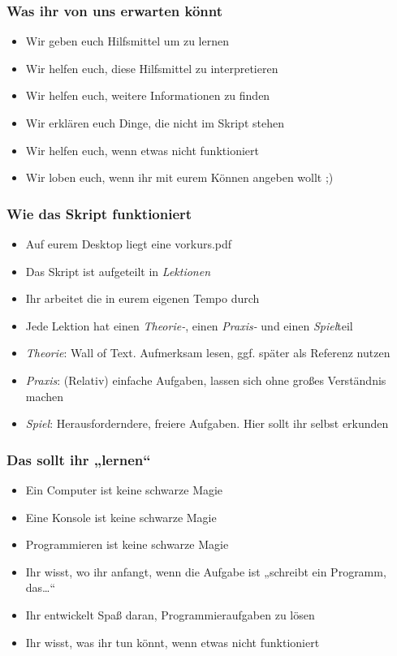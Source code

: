 \begin{frame}
    \frametitle{Was ihr von uns erwarten könnt}
    \begin{itemize}
        \item Wir geben euch Hilfsmittel um zu lernen
        \pause\item Wir helfen euch, diese Hilfsmittel zu interpretieren
        \pause\item Wir helfen euch, weitere Informationen zu finden
        \pause\item Wir erklären euch Dinge, die nicht im Skript stehen
        \pause\item Wir helfen euch, wenn etwas nicht funktioniert
        \pause\item Wir loben euch, wenn ihr mit eurem Können angeben wollt ;)
    \end{itemize}
\end{frame}

\begin{frame}
    \frametitle{Wie das Skript funktioniert}
    \begin{itemize}
        \item Auf eurem Desktop liegt eine vorkurs.pdf
        \pause\item Das Skript ist aufgeteilt in \emph{Lektionen}
        \pause\item Ihr arbeitet die in eurem eigenen Tempo durch
        \pause\item Jede Lektion hat einen \emph{Theorie-}, einen
            \emph{Praxis-} und einen \emph{Spiel}teil
        \pause\item \emph{Theorie}: Wall of Text. Aufmerksam lesen, ggf. später
            als Referenz nutzen
        \pause\item \emph{Praxis}: (Relativ) einfache Aufgaben, lassen sich
            ohne großes Verständnis machen
        \pause\item \emph{Spiel}: Herausforderndere, freiere Aufgaben. Hier
            sollt ihr selbst erkunden
    \end{itemize}
\end{frame}

\begin{frame}
    \frametitle{Das sollt ihr „lernen“}
    \begin{itemize}
        \item Ein Computer ist keine schwarze Magie
        \pause\item Eine Konsole ist keine schwarze Magie
        \pause\item Programmieren ist keine schwarze Magie
        \pause\item Ihr wisst, wo ihr anfangt, wenn die Aufgabe ist „schreibt
            ein Programm, das\dots“
        \pause\item Ihr entwickelt Spaß daran, Programmieraufgaben zu lösen
        \pause\item Ihr wisst, was ihr tun könnt, wenn etwas nicht funktioniert
    \end{itemize}
\end{frame}

